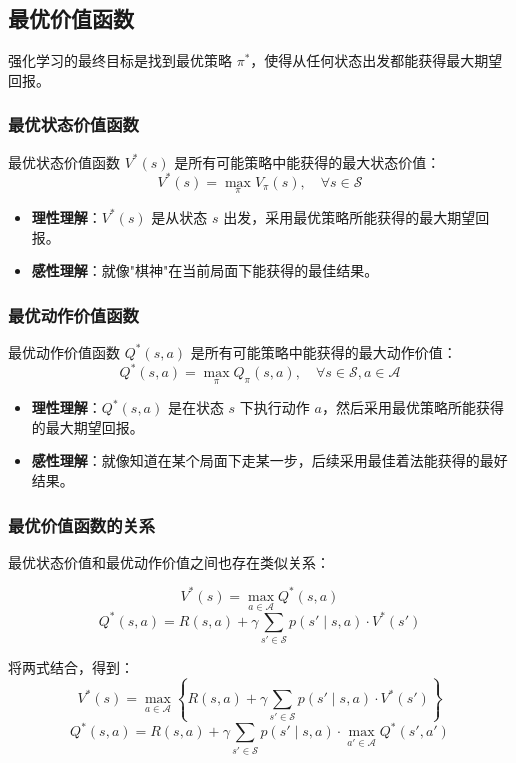 \subsection{最优价值函数}

强化学习的最终目标是找到最优策略 $\pi^*$，使得从任何状态出发都能获得最大期望回报。

\subsubsection{最优状态价值函数}
\begin{definition}[最优状态价值函数]
最优状态价值函数 $V^*(s)$ 是所有可能策略中能获得的最大状态价值：
\[
V^*(s) = \max_\pi V_\pi(s), \quad \forall s \in \mathcal{S}
\]
\begin{itemize}
    \item \textbf{理性理解}：$V^*(s)$ 是从状态 $s$ 出发，采用最优策略所能获得的最大期望回报。
    \item \textbf{感性理解}：就像"棋神"在当前局面下能获得的最佳结果。
\end{itemize}
\end{definition}

\subsubsection{最优动作价值函数}
\begin{definition}[最优动作价值函数]
最优动作价值函数 $Q^*(s, a)$ 是所有可能策略中能获得的最大动作价值：
\[
Q^*(s, a) = \max_\pi Q_\pi(s, a), \quad \forall s \in \mathcal{S}, a \in \mathcal{A}
\]
\begin{itemize}
    \item \textbf{理性理解}：$Q^*(s, a)$ 是在状态 $s$ 下执行动作 $a$，然后采用最优策略所能获得的最大期望回报。
    \item \textbf{感性理解}：就像知道在某个局面下走某一步，后续采用最佳着法能获得的最好结果。
\end{itemize}
\end{definition}

\subsubsection{最优价值函数的关系}
最优状态价值和最优动作价值之间也存在类似关系：

\[
V^*(s) = \max_{a \in \mathcal{A}} Q^*(s, a)
\]
\[
Q^*(s, a) = R(s, a) + \gamma \sum_{s' \in \mathcal{S}} p(s' \mid s, a) \cdot V^*(s')
\]

将两式结合，得到：
\[
V^*(s) = \max_{a \in \mathcal{A}} \left\{ R(s, a) + \gamma \sum_{s' \in \mathcal{S}} p(s' \mid s, a) \cdot V^*(s') \right\}
\]
\[
Q^*(s, a) = R(s, a) + \gamma \sum_{s' \in \mathcal{S}} p(s' \mid s, a) \cdot \max_{a' \in \mathcal{A}} Q^*(s', a')
\]

